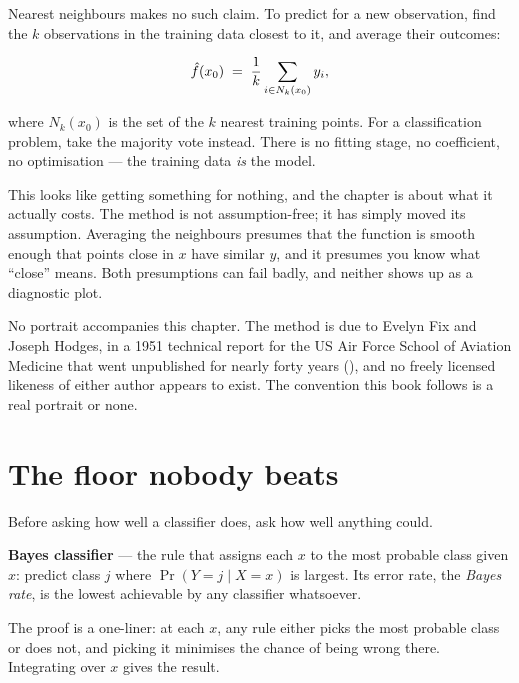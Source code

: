 \documentclass[
  letterpaper,
  10pt,
  twoside,
  openright,
  numbers=noenddot,
  chapterprefix=true]{scrbook}
\newenvironment{qmibmuted}{\begingroup\small\color{econmuted}}{\par\endgroup}
\begin{document}
Nearest neighbours makes no such claim. To predict for a new
observation, find the \(k\) observations in the training data closest to
it, and average their outcomes:

\[
\hat f(x_0) \thickspace=\thickspace \frac{1}{k} \sum_{i \in N_k(x_0)} y_i ,
\]

where \(N_k(x_0)\) is the set of the \(k\) nearest training points. For
a classification problem, take the majority vote instead. There is no
fitting stage, no coefficient, no optimisation --- the training data
\emph{is} the model.

This looks like getting something for nothing, and the chapter is about
what it actually costs. The method is not assumption-free; it has simply
moved its assumption. Averaging the neighbours presumes that the
function is smooth enough that points close in \(x\) have similar \(y\),
and it presumes you know what ``close'' means. Both presumptions can
fail badly, and neither shows up as a diagnostic plot.

\begin{qmibmuted}

No portrait accompanies this chapter. The method is due to Evelyn Fix
and Joseph Hodges, in a 1951 technical report for the US Air Force
School of Aviation Medicine that went unpublished for nearly forty years
(), and no freely licensed
likeness of either author appears to exist. The convention this book
follows is a real portrait or none.

\end{qmibmuted}

\section{The floor nobody beats}\label{the-floor-nobody-beats}

Before asking how well a classifier does, ask how well anything could.

\begin{qmibdefinition}

{\textbf{Bayes classifier}} --- the rule that assigns each \(x\) to the
most probable class given \(x\): predict class \(j\) where
\(\Pr(Y = j \mid X = x)\) is largest. Its error rate, the \emph{Bayes
rate}, is the lowest achievable by any classifier whatsoever.

\end{qmibdefinition}

The proof is a one-liner: at each \(x\), any rule either picks the most
probable class or does not, and picking it minimises the chance of being
wrong there. Integrating over \(x\) gives the result.
\end{document}
